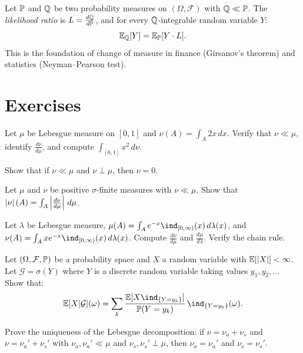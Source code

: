 \begin{example}
Let $\mathbb{P}$ and $\mathbb{Q}$ be two probability measures on $(\Omega, \mathcal{F})$ with
$\mathbb{Q} \ll \mathbb{P}$. The \emph{likelihood ratio} is $L = \frac{d\mathbb{Q}}{d\mathbb{P}}$, and for every
$\mathbb{Q}$-integrable random variable $Y$:
\[
    \mathbb{E}_{\mathbb{Q}}[Y] = \mathbb{E}_{\mathbb{P}}[Y \cdot L].
\]
This is the foundation of change of measure in finance (Girsanov's theorem) and
statistics (Neyman--Pearson test).
\end{example}

\section{Exercises}

\begin{exercise}
Let $\mu$ be Lebesgue measure on $[0,1]$ and $\nu(A) = \int_A 2x\, dx$. Verify
that $\nu \ll \mu$, identify $\frac{d\nu}{d\mu}$, and compute
$\int_{[0,1]} x^2\, d\nu$.
\end{exercise}

\begin{exercise}
Show that if $\nu \ll \mu$ and $\nu \perp \mu$, then $\nu = 0$.
\end{exercise}

\begin{exercise}
Let $\mu$ and $\nu$ be positive $\sigma$-finite measures with $\nu \ll \mu$. Show
that $\left| \nu \right|(A) = \int_A \left| \frac{d\nu}{d\mu} \right|\, d\mu$.
\end{exercise}

\begin{exercise}
Let $\lambda$ be Lebesgue measure,
$\mu(A) = \int_A e^{-x} \ind_{[0,\infty)}(x)\, d\lambda(x)$, and
$\nu(A) = \int_A x e^{-x} \ind_{[0,\infty)}(x)\, d\lambda(x)$.
Compute $\frac{d\nu}{d\mu}$ and $\frac{d\mu}{d\lambda}$. Verify the chain rule.
\end{exercise}

\begin{exercise}
Let $(\Omega, \mathcal{F}, \mathbb{P})$ be a probability space and $X$ a random variable
with $\mathbb{E}[\left| X \right|] < \infty$. Let $\mathcal{G} = \sigma(Y)$ where $Y$ is a discrete
random variable taking values $y_1, y_2, \ldots$ Show that:
\[
    \E[X | \mathcal{G}](\omega)
    = \sum_k \frac{\E[X \ind_{\{Y = y_k\}}]}{\PP(Y = y_k)}\, \ind_{\{Y = y_k\}}(\omega).
\]
\end{exercise}

\begin{exercise}
Prove the uniqueness of the Lebesgue decomposition: if $\nu = \nu_a + \nu_s$ and
$\nu = \nu_a' + \nu_s'$ with $\nu_a, \nu_a' \ll \mu$ and
$\nu_s, \nu_s' \perp \mu$, then $\nu_a = \nu_a'$ and $\nu_s = \nu_s'$.
\end{exercise}
